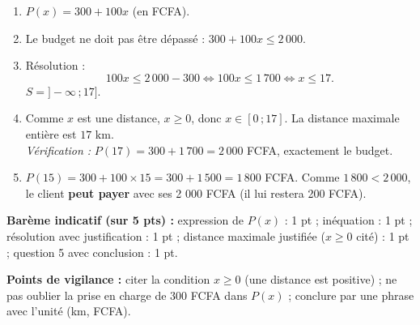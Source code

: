 \documentclass[11pt]{article}
\begin{document}
\begin{corrige}
\begin{enumerate}
    \item $P(x) = 300 + 100x$ (en FCFA).
    \item Le budget ne doit pas être dépassé : $300 + 100x \leqslant 2\,000$.
    \item Résolution :
    \[ 100x \leqslant 2\,000 - 300 \iff 100x \leqslant 1\,700 \iff x \leqslant 17. \]
    $S = ]-\infty\,; 17]$.
    \item Comme $x$ est une distance, $x \geqslant 0$, donc $x \in [0\,; 17]$. La distance maximale entière est $\boxed{17 \text{ km}}$.\\
    \emph{Vérification :} $P(17) = 300 + 1\,700 = 2\,000$ FCFA, exactement le budget.
    \item $P(15) = 300 + 100 \times 15 = 300 + 1\,500 = 1\,800$ FCFA. Comme $1\,800 < 2\,000$, le client \textbf{peut payer} avec ses 2 000 FCFA (il lui restera 200 FCFA).
\end{enumerate}

\textbf{Barème indicatif (sur 5 pts) :} expression de $P(x)$ : 1 pt ; inéquation : 1 pt ; résolution avec justification : 1 pt ; distance maximale justifiée ($x \geqslant 0$ cité) : 1 pt ; question 5 avec conclusion : 1 pt.

\textbf{Points de vigilance :} citer la condition $x \geqslant 0$ (une distance est positive) ; ne pas oublier la prise en charge de 300 FCFA dans $P(x)$ ; conclure par une phrase avec l'unité (km, FCFA).
\end{corrige}
\end{document}
